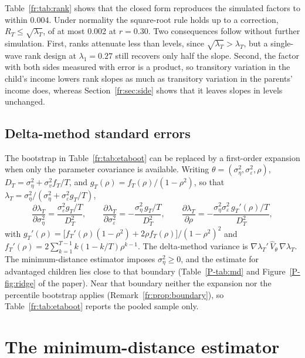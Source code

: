 Table~\ref{fr:tab:rank} shows that the closed form reproduces the
simulated factors to within 0.004. Under normality the square-root rule holds up to a correction, $R_T \le \sqrt{\lambda_T}$, of at most 0.002 at $r = 0.30$. Two consequences follow without
further simulation. First, ranks attenuate less than levels, since
$\sqrt{\lambda_T} > \lambda_T$, but a single-wave rank design at
$\lambda_1 = 0.27$ still recovers only half the slope. Second, the factor
with both sides measured with error is a product, so transitory variation
in the child's income lowers rank slopes as much as transitory variation
in the parents' income does, whereas Section~\ref{fr:sec:side} shows
that it leaves slopes in levels unchanged.

\subsection{Delta-method standard errors}

The bootstrap in Table~\ref{fr:tab:etaboot} can be replaced by a
first-order expansion when only the parameter covariance is available.
Writing $\theta = (\sigma^2_\eta, \sigma^2_\varepsilon, \rho)$,
$D_T = \sigma^2_\eta + \sigma^2_v f_T/T$, and
$g_T(\rho) = f_T(\rho)/(1-\rho^2)$, so that
$\lambda_T = \sigma^2_\eta/(\sigma^2_\eta + \sigma^2_\varepsilon g_T/T)$,
\begin{equation}
\frac{\partial \lambda_T}{\partial \sigma^2_\eta} = \frac{\sigma^2_\varepsilon g_T/T}{D_T^2}, \qquad
\frac{\partial \lambda_T}{\partial \sigma^2_\varepsilon} = -\frac{\sigma^2_\eta\, g_T/T}{D_T^2}, \qquad
\frac{\partial \lambda_T}{\partial \rho} = -\frac{\sigma^2_\eta\sigma^2_\varepsilon\, g_T'(\rho)/T}{D_T^2},
\label{fr:eq:delta}
\end{equation}
with $g_T'(\rho) = \big[f_T'(\rho)(1-\rho^2) + 2\rho f_T(\rho)\big]/(1-\rho^2)^2$
and $f_T'(\rho) = 2\sum_{k=1}^{T-1}k(1-k/T)\rho^{k-1}$. The delta-method
variance is $\nabla\lambda_T' \,\hat V_\theta\, \nabla\lambda_T$. The
minimum-distance estimator imposes $\sigma^2_\eta \ge 0$, and the estimate
for advantaged children lies close to that boundary
(Table~\ref{P-tab:md} and Figure~\ref{P-fig:ridge} of the paper). Near that boundary neither the expansion nor the percentile bootstrap applies (Remark~\ref{fr:prop:boundary}), so Table~\ref{fr:tab:etaboot} reports the pooled sample only.

\section{The minimum-distance estimator}
\label{fr:sec:md}


